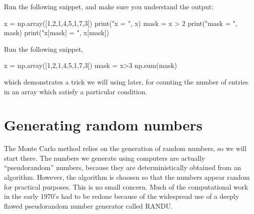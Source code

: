 \plot Run the following snippet, and make sure you understand the output:
\begin{python}
x = np.array([1,2,1,4,5,1,7,3])
print("x       = ", x)
mask = x > 2
print("mask    = ", mask)
print("x[mask] = ", x[mask])
\end{python} \vskip 0.25cm

\plot Run the following snippet, 
\begin{python}
x = np.array([1,2,1,4,5,1,7,3])
mask = x>3
np.sum(mask)
\end{python}
which demonstrates a trick we will using later, for counting the
number of entries in an array which satisfy a particular condition.\\

\section{Generating random numbers}

The Monte Carlo method relies on the generation of random numbers, so
we will start there.  The numbers we generate using computers are
actually ``pseudorandom'' numbers, because they are deterministically
obtained from an algorithm.  However, the algorithm is choosen so that
the numbers appear random for practical purposes.  This is no small
concern.  Much of the computational work in the early 1970's had to be
redone because of the widespread use of a deeply flawed pseudorandom
number generator called RANDU.

